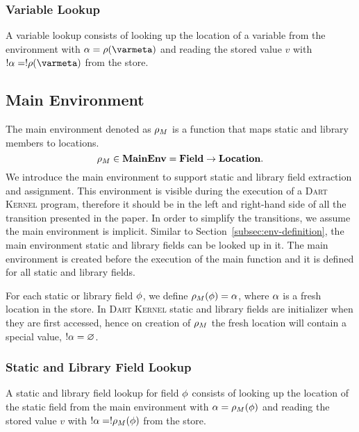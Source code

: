 \documentclass[a4paper,oneside,fleqn]{article}
\newcommand{\kernel}{\textsc{Dart Kernel}}
\renewcommand{\emptyset}{\varnothing}
\newcommand{\dmenv}{\mathbf{MainEnv}}
\newcommand{\dfield}{\mathbf{Field}}
\begin{document}
\subsubsection{Variable Lookup}
\label{subsubsec:variable-lookup}

A variable lookup consists of looking up the location of a variable from the environment with $\loc = \env(\varmeta)$ and reading the stored value $v$ with $\deref{\loc} = \deref{\env(\varmeta)}$ from the store.


\subsection{Main Environment}
\label{subsec:main-env}

The main environment denoted as $\rho_{M}$ is a function that maps static and library members to locations.
\[
    \mainenv \in \dmenv = \dfield \rightarrow \dlocation.
\]
We introduce the main environment to support static and library field extraction and assignment.
This environment is visible during the execution of a \kernel{} program, therefore it should be in the left and right-hand side of all the transition presented in the paper.
In order to simplify the transitions, we assume the main environment is implicit.
Similar to Section~\ref{subsec:env-definition}, the main environment static and library fields can be looked up in it.
The main environment is created before the execution of the main function and it is defined for all static and library fields.

For each static or library field $\phi$, we define $\rho_{M}(\phi) = \alpha$, where $\alpha$ is a fresh location in the store.
In \kernel{} static and library fields are initializer when they are first accessed, hence on creation of $\rho_{M}$ the fresh location will contain a special value, $\deref{\loc} = \emptyset$.

\subsubsection{Static and Library Field Lookup}
\label{subsubsec:static-field-lookup}

A static and library field lookup for field $\phi$ consists of looking up the location of the static field from the main environment with $\alpha = \rho_{M}(\phi)$ and reading the stored value $v$ with $!\alpha = !\rho_{M}(\phi)$ from the store.
\end{document}
